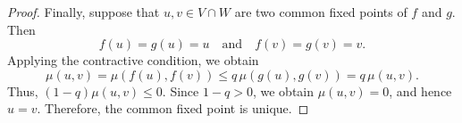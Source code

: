 \documentclass[10pt,a4paper]{amsart}
\begin{document}
\begin{proof}
Finally, suppose that $u,v\in V\cap W$ are two common fixed points of
$f$ and $g$. Then
\[
f(u)=g(u)=u
\quad\text{and}\quad
f(v)=g(v)=v.
\]
Applying the contractive condition, we obtain
\[
\mu(u,v)
=
\mu(f(u),f(v))
\leq
q\,\mu(g(u),g(v))
=
q\,\mu(u,v).
\]
Thus, $(1-q)\mu(u,v)\leq0$. 
Since $1-q>0$, we obtain $\mu(u,v)=0$, 
and hence $u=v$. Therefore, the common fixed point is unique.
\end{proof}
\end{document}
